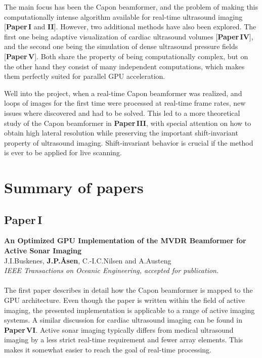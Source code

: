 The main focus has been the Capon beamformer, and the problem of making this computationally intense algorithm available for real-time ultrasound imaging [\textbf{Paper\,I} and \textbf{II}]. However, two additional methods have also been explored. The first one being adaptive visualization of cardiac ultrasound volumes [\textbf{Paper\,IV}], and the second one being the simulation of dense ultrasound pressure fields [\textbf{Paper\,V}]. Both share the property of being computationally complex, but on the other hand they consist of many independent computations, which makes them perfectly suited for parallel GPU acceleration.

Well into the project, when a real-time Capon beamformer was realized, and loops of images for the first time were processed at real-time frame rates, new issues where discovered and had to be solved. This led to a more theoretical study of the Capon beamformer in \textbf{Paper\,III}, with special attention on how to obtain high lateral resolution while preserving the important shift-invariant property of ultrasound imaging. Shift-invariant behavior is crucial if the method is ever to be applied for live scanning. 



\section{Summary of papers}

\subsection{Paper\,I}
\textbf{An Optimized GPU Implementation of the MVDR Beamformer for Active Sonar Imaging}\\
J.\:I.\:Buskenes, \textbf{J.\:P.\:\AA{}sen}, C.-I.\:C.\:Nilsen and A.\:Austeng\\
{\it IEEE Transactions on Oceanic Engineering, accepted for publication.}\\\\
The first paper describes in detail how the Capon beamformer is mapped to the GPU architecture. Even though the paper is written within the field of active  imaging, the presented implementation is applicable to a range of active imaging systems. A similar discussion for cardiac ultrasound imaging can be found in \textbf{Paper\,VI}.  Active sonar imaging typically differs from medical ultrasound imaging by a less strict real-time requirement and fewer array elements. This makes it somewhat easier to reach the goal of real-time processing. 

